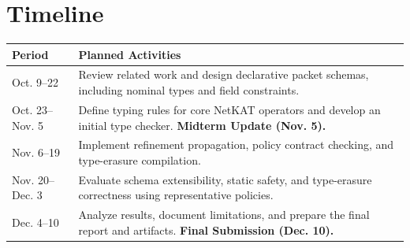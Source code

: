 \section{Timeline}

\begin{table}[H]
\centering
\label{tab:timeline}
\small
\begin{tabular}{@{}p{}p{}@{}}
\toprule
\textbf{Period} & \textbf{Planned Activities} \\
\midrule

Oct. 9--22
& Review related work and design declarative packet schemas,
including nominal types and field constraints. \\

\addlinespace

Oct. 23--Nov. 5
& Define typing rules for core NetKAT operators and develop
an initial type checker.
\textbf{Midterm Update (Nov. 5).} \\

\addlinespace

Nov. 6--19
& Implement refinement propagation, policy contract checking,
and type-erasure compilation. \\

\addlinespace

Nov. 20--Dec. 3
& Evaluate schema extensibility, static safety, and
type-erasure correctness using representative policies. \\

\addlinespace

Dec. 4--10
& Analyze results, document limitations, and prepare
the final report and artifacts.
\textbf{Final Submission (Dec. 10).} \\

\bottomrule
\end{tabular}
\end{table}